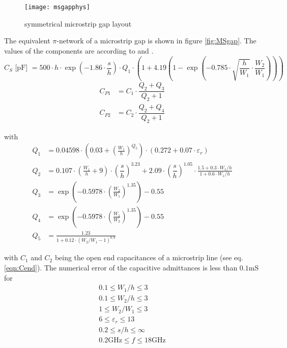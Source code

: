 \documentclass[10pt]{report}
\begin{document}
\begin{figure}[ht]
\begin{center}
\texttt{[image: msgapphys]}
\end{center}
\caption{symmetrical microstrip gap layout}
\label{fig:MSgaPhys}
\end{figure}
\FloatBarrier

The equivalent $\pi$-network of a microstrip gap is shown in figure
\ref{fig:MSgap}.  The values of the components are according to
\cite{Kirschning8} and \cite{Kirschning4}.
\begin{equation}
C_S \textrm{ [pF] } = 500\cdot h\cdot\exp\left( -1.86\cdot\dfrac{s}{h} \right)\cdot Q_1\cdot
       \left( 1 + 4.19\left( 1 - \exp\left( -0.785\cdot\sqrt{\dfrac{h}{W_1}}\cdot
       \dfrac{W_2}{W_1} \right) \right) \right)
\end{equation}
\begin{align}
C_{P1} &= C_1\cdot \dfrac{Q_2+Q_3}{Q_2+1}\\
C_{P2} &= C_2\cdot \dfrac{Q_2+Q_4}{Q_2+1}
\end{align}

with
\begin{align}
Q_1 &= 0.04598\cdot \left( 0.03 + \left(\frac{W_1}{h}\right)^{Q_5} \right)\cdot
      (0.272 + 0.07\cdot\varepsilon_r)\\
Q_2 &= 0.107\cdot\left( \frac{W_1}{h}+9 \right) \cdot \left( \dfrac{s}{h} \right)^{3.23}
    + 2.09 \cdot \left( \dfrac{s}{h} \right)^{1.05}\cdot
    \frac{1.5+0.3\cdot W_1/h}{1+0.6\cdot W_1/h}\\
Q_3 &= \exp\left( -0.5978\cdot \left( \frac{W_2}{W_1} \right)^{1.35} \right) - 0.55\\
Q_4 &= \exp\left( -0.5978\cdot \left( \frac{W_1}{W_2} \right)^{1.35} \right) - 0.55\\
Q_5 &= \frac{1.23}{1 + 0.12\cdot \left( W_2 / W_1 - 1 \right)^{0.9}}
\end{align}

with $C_1$ and $C_2$ being the open end capacitances of a microstrip
line (see eq. \eqref{eqn:Cend}).  The numerical error of the
capacitive admittances is less than $0.1$mS for
\begin{equation*}
\begin{split}
0.1\le W_1/h \le 3 \\
0.1\le W_2/h \le 3 \\
1\le W_2/W_1 \le 3 \\
6\le \varepsilon_r \le 13 \\
0.2\le s/h \le \infty \\
0.2\text{GHz} \le f \le 18\text{GHz}
\end{split}
\end{equation*}
\end{document}
